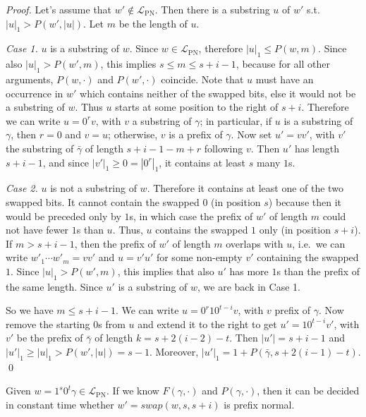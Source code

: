 \documentclass[11pt,a4paper]{llncs}
\def\swap{\textit{swap}}
\newcommand{\LPN}{{\mathcal L}_{\textrm{PN}}}
\begin{document}
\begin{proof}
Let's assume that $w'\not\in \LPN$. Then there is a substring $u$ of $w'$ s.t.\ $|u|_1 > P(w',|u|)$. Let $m$ be the length of $u$.

{\em Case 1.} $u$ is a substring of $w$. Since $w\in \LPN$, therefore $|u|_1 \leq P(w,m)$. Since also $|u|_1 > P(w',m)$, this implies $s\leq m \leq s+i-1$, because for all other arguments, $P(w,\cdot)$ and $P(w',\cdot)$ coincide. Note that $u$ must have an occurrence in $w'$ which contains neither of the swapped bits, else it would not be a substring of $w$. Thus $u$ starts at some position to the right of $s+i$. Therefore we can write $u = 0^r v$, with $v$ a substring of $\gamma$; in particular, if $u$ is a substring of $\gamma$, then $r=0$ and $v=u$; otherwise, $v$ is a prefix of $\gamma$. Now set $u' = vv'$, with $v'$ the substring of $\bar\gamma$ of length $s+i-1-m+r$ following $v$. Then $u'$ has length $s+i-1$, and since $|v'|_1 \geq 0 = |0^r|_1$,  it contains at least $s$ many $1$s.

{\em Case 2.} $u$ is not a substring of $w$. Therefore it contains at least one of the two swapped bits. It cannot contain the swapped $0$ (in position $s$) because then it would be preceded only by $1$s, in which case the prefix of $w'$ of length $m$ could not have fewer $1$s than $u$. Thus, $u$ contains the swapped $1$ only (in position $s+i$). If $m>s+i-1$, then the prefix of $w'$ of length $m$ overlaps with $u$, i.e.\ we can write $w'_1\cdots w'_m = vv'$ and $u=v'u'$ for some non-empty $v'$ containing the swapped $1$. Since $|u|_1 > P(w',m)$, this implies that also $u'$ has more $1$s than the prefix of the same length. Since $u'$ is a substring of $w$, we are back in Case 1. 

So we have $m\leq s+i-1$. We can write $u=0^r10^{t-i}v$, with $v$ prefix of $\gamma$. Now remove the starting $0$s from $u$ and extend it to the right to get $u' = 10^{t-i}v'$, with $v'$ be the prefix of $\bar\gamma$ of length $k=s+2(i-2)-t$. Then $|u'| = s+i-1$ and $|u'|_1 \geq |u|_1 > P(w',|u|) = s-1$. Moreover, $|u'|_1 = 1 + P(\bar\gamma,s+2(i-1)-t)$. \hfill \qed
\end{proof}


\begin{corollary}\label{coro:isPNF}
Given $w=1^s0^t\gamma \in \LPN$. If we know $F(\gamma,\cdot)$ and $P(\gamma,\cdot)$, then it can be decided in constant time whether $w' = \swap(w,s,s+i)$ is prefix normal.
\end{corollary}
\end{document}
